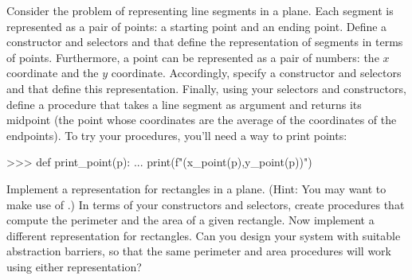 \begin{exerciseGroup}
\label{Exercise 2.2}
 Consider the problem of
representing line segments in a plane.  Each segment is represented as a pair
of points: a starting point and an ending point.  Define a constructor
 and selectors  and 
that define the representation of segments in terms of points.  Furthermore, a
point can be represented as a pair of numbers: the \( x \) coordinate and the
\( y \) coordinate.  Accordingly, specify a constructor  and
selectors  and  that define this representation.
Finally, using your selectors and constructors, define a procedure
 that takes a line segment as argument and returns its
midpoint (the point whose coordinates are the average of the coordinates of the
endpoints).  To try your procedures, you'll need a way to print points:

\begin{codeBlock}
>>> def print_point(p):
...     print(f"({x_point(p)},{y_point(p)})")
\end{codeBlock}

\label{Exercise 2.3}
 Implement a representation for
rectangles in a plane.  (Hint: You may want to make use of .)
In terms of your constructors and selectors, create procedures that compute the
perimeter and the area of a given rectangle.  Now implement a different
representation for rectangles.  Can you design your system with suitable
abstraction barriers, so that the same perimeter and area procedures will work
using either representation?
\end{exerciseGroup}


